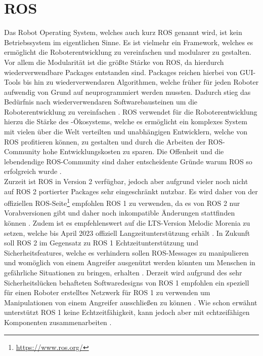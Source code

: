 \section{ROS}
Das Robot Operating System, welches auch kurz ROS genannt wird, ist kein Betriebssystem im eigentlichen Sinne. Es ist vielmehr ein Framework, welches es ermöglicht die Roboterentwicklung zu vereinfachen und modularer zu gestalten. Vor allem die Modularität ist die größte Stärke von ROS, da hierdurch wiederverwendbare Packages entstanden sind. Packages reichen hierbei von GUI-Tools bis hin zu wiederverwendaren Algorithmen, welche früher für jeden Roboter aufwendig von Grund auf neuprogrammiert werden mussten. Dadurch stieg das Bedürfnis nach wiederverwendaren Softwarebausteinen um die Roboterentwicklung zu vereinfachen \cite[517]{worn_echtzeitsysteme_2006}. ROS verwendet für die Roboterentwicklung hierzu die Stärke des -Ökosystems, welche es ermöglicht ein komplexes System mit vielen über die Welt verteilten und unabhängigen Entwicklern, welche von ROS profitieren können, zu gestalten und durch die Arbeiten der ROS-Community hohe Entwicklungskosten zu sparen. Die Offenheit und die lebendendige ROS-Community sind daher entscheidente Gründe warum ROS so erfolgreich wurde \cite[411\psq]{koubaa_robot_operating_system_2019}.\\

Zurzeit ist ROS in Version 2 verfügbar, jedoch aber aufgrund vieler noch nicht auf ROS 2 portierter Packages sehr eingeschränkt nutzbar. Es wird daher von der offiziellen ROS-Seite\footnote{\href{https://www.ros.org/}{https://www.ros.org/}} empfohlen ROS 1 zu verwenden, da es von ROS 2 nur Vorabversionen gibt und daher noch inkompatible Änderungen stattfinden können \cite{ros_distributions_nodate}. Zudem ist es empfehlenswert auf die LTS-Version Melodic Morenia zu setzen, welche bis April 2023 offiziell Langzeitunterstützung erhält \cite{robot_operating_system_2020}. In Zukunft soll ROS 2 im Gegensatz zu ROS 1 Echtzeitunterstützung und Sicherheitsfeatures, welche es verhindern sollen ROS-Messages zu manipulieren und womöglich von einem Angreifer ausgenützt werden könnten um Menschen in gefährliche Situationen zu bringen, erhalten \cite[613\psqq]{koubaa_robot_operating_system_2019}. Derzeit wird  aufgrund des sehr Sicherheitslücken behafteten Softwaredesigns von ROS 1 empfohlen ein speziell für einen Roboter erstelltes Netzwerk für ROS 1 zu verwenden um Manipulationen von einem Angreifer ausschließen zu können \cite{pohl_robot_operating_system_2014}. Wie schon erwähnt unterstützt ROS 1 keine Echtzeitfähigkeit, kann jedoch aber mit echtzeifähigen Komponenten zusammenarbeiten \cite{robot_operating_system_2020}.\clearpage

